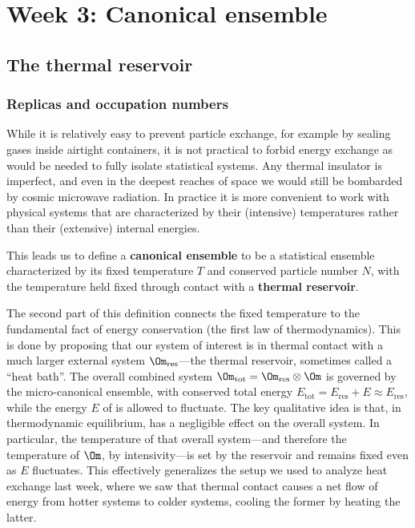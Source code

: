 \renewcommand{\thisweek}{MATH327 Week 3}
\renewcommand{\moddate}{Last modified 4 Mar.~2021}
\setcounter{section}{3}
\setcounter{subsection}{0}
{}
\section*{Week 3: Canonical ensemble}
\subsection{\label{sec:reservoir}The thermal reservoir}
\subsubsection{\label{sec:replicas}Replicas and occupation numbers}
While it is relatively easy to prevent particle exchange, for example by sealing gases inside airtight containers, it is not practical to forbid energy exchange as would be needed to fully isolate statistical systems.
Any thermal insulator is imperfect, and even in the deepest reaches of space we would still be bombarded by cosmic microwave radiation.
In practice it is more convenient to work with physical systems that are characterized by their (intensive) temperatures rather than their (extensive) internal energies.

\begin{shaded}
  This leads us to define a \textbf{canonical ensemble} to be a statistical ensemble characterized by its fixed temperature $T$ and conserved particle number $N$, with the temperature held fixed through contact with a \textbf{thermal reservoir}.
\end{shaded}

The second part of this definition connects the fixed temperature to the fundamental fact of energy conservation (the first law of thermodynamics).
This is done by proposing that our system of interest \Om is in thermal contact with a much larger external system $\Om_{\text{res}}$---the thermal reservoir, sometimes called a ``heat bath''.
The overall combined system $\Om_{\text{tot}} = \Om_{\text{res}} \otimes \Om$ is governed by the micro-canonical ensemble, with conserved total energy $E_{\text{tot}} = E_{\text{res}} + E \approx E_{\text{res}}$, while the energy $E$ of \Om is allowed to fluctuate.
The key qualitative idea is that, in thermodynamic equilibrium, \Om has a negligible effect on the overall system.
In particular, the temperature of that overall system---and therefore the temperature of $\Om$, by intensivity---is set by the reservoir and remains fixed even as $E$ fluctuates.
This effectively generalizes the setup we used to analyze heat exchange last week, where we saw that thermal contact causes a net flow of energy from hotter systems to colder systems, cooling the former by heating the latter.

